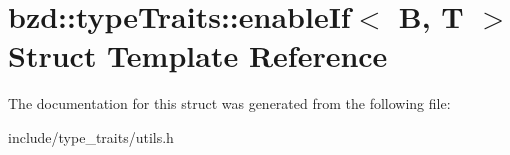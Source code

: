 \hypertarget{structbzd_1_1typeTraits_1_1enableIf}{}\section{bzd\+:\+:type\+Traits\+:\+:enable\+If$<$ B, T $>$ Struct Template Reference}
\label{structbzd_1_1typeTraits_1_1enableIf}


The documentation for this struct was generated from the following file\+:\begin{DoxyCompactItemize}
\item 
include/type\+\_\+traits/utils.\+h\end{DoxyCompactItemize}
